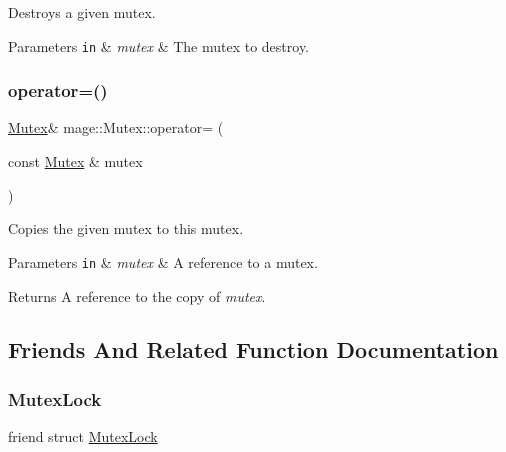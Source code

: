 Destroys a given mutex.


\begin{DoxyParams}[1]{Parameters}
\mbox{\tt in}  & {\em mutex} & The mutex to destroy. \\
\hline
\end{DoxyParams}
\hypertarget{classmage_1_1_mutex_aeaab2190729234e0da465ed0196111f0}{}\label{classmage_1_1_mutex_aeaab2190729234e0da465ed0196111f0} 
\subsubsection{\texorpdfstring{operator=()}{operator=()}}
{\footnotesize\ttfamily \hyperlink{classmage_1_1_mutex}{Mutex}\& mage\+::\+Mutex\+::operator= (\begin{DoxyParamCaption}\item[{const \hyperlink{classmage_1_1_mutex}{Mutex} \&}]{mutex }\end{DoxyParamCaption})\hspace{0.3cm}{\ttfamily [private]}}

Copies the given mutex to this mutex.


\begin{DoxyParams}[1]{Parameters}
\mbox{\tt in}  & {\em mutex} & A reference to a mutex. \\
\hline
\end{DoxyParams}
\begin{DoxyReturn}{Returns}
A reference to the copy of {\itshape mutex}. 
\end{DoxyReturn}


\subsection{Friends And Related Function Documentation}
\hypertarget{classmage_1_1_mutex_a058473d070063e5098732f355f432bd9}{}\label{classmage_1_1_mutex_a058473d070063e5098732f355f432bd9} 
\subsubsection{\texorpdfstring{Mutex\+Lock}{MutexLock}}
{\footnotesize\ttfamily friend struct \hyperlink{structmage_1_1_mutex_lock}{Mutex\+Lock}\hspace{0.3cm}{\ttfamily [friend]}}



